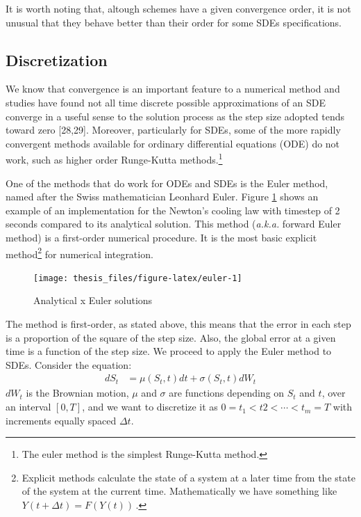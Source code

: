 \documentclass[12pt,oneside]{reedthesis}
\theoremstyle{definition}
\theoremstyle{definition}
\theoremstyle{remark}
\begin{document}
  It is worth noting that, altough schemes have a given convergence order,
  it is not unusual that they behave better than their order for some SDEs
  specifications.
  
  \subsection{Discretization}\label{discretization}
  
  We know that convergence is an important feature to a numerical method
  and studies have found not all time discrete possible approximations of
  an SDE converge in a useful sense to the solution process as the step
  size adopted tends toward zero {[}28,29{]}. Moreover, particularly for
  SDEs, some of the more rapidly convergent methods available for ordinary
  differential equations (ODE) do not work, such as higher order
  Runge-Kutta methods.\footnote{The euler method is the simplest
    Runge-Kutta method.}
  
  One of the methods that do work for ODEs and SDEs is the Euler method,
  named after the Swiss mathematician Leonhard Euler. Figure
  \ref{fig:euler} shows an example of an implementation for the Newton's
  cooling law with timestep of 2 seconds compared to its analytical
  solution. This method (\emph{a.k.a.} forward Euler method) is a
  first-order numerical procedure. It is the most basic explicit
  method\footnote{Explicit methods calculate the state of a system at a
    later time from the state of the system at the current time.
    Mathematically we have something like \(Y(t+\Delta t)=F(Y(t))\,\).}
  for numerical integration.
  \begin{figure}
  
  {\centering \texttt{[image: thesis\_files/figure-latex/euler-1]} 
  
  }
  
  \caption{Analytical x Euler solutions \label{euler}}\label{fig:euler}
  \end{figure}
  The method is first-order, as stated above, this means that the error in
  each step is a proportion of the square of the step size. Also, the
  global error at a given time is a function of the step size. We proceed
  to apply the Euler method to SDEs. Consider the equation:
  \begin{align}
  dS_t &= \mu(S_t,t) dt + \sigma(S_t,t) dW_t
  \end{align}
  \(dW_t\) is the Brownian motion, \(\mu\) and \(\sigma\) are functions
  depending on \(S_t\) and \(t\), over an interval \([0,T]\), and we want
  to discretize it as \(0 = t_1 < t2 < \cdots < t_m = T\) with increments
  equally spaced \(\Delta t\).
  
\end{document}
